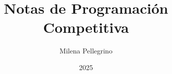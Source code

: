 \documentclass[a4paper,12pt]{book}
\begin{document}
\author{Milena Pellegrino}
\title{Notas de  Programación Competitiva}
\date{2025}

\frontmatter
\maketitle
\tableofcontents

\mainmatter



\backmatter
\end{document}
